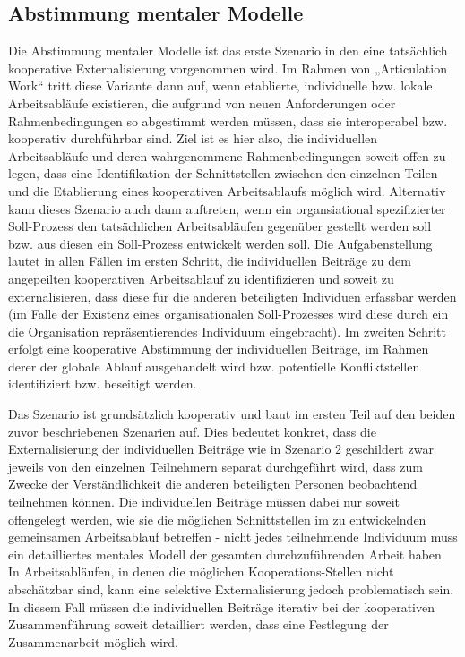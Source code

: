 
\subsection{Abstimmung mentaler Modelle} %
\label{sub:abstimmung_individueller_mentaler_modelle}

Die Abstimmung mentaler Modelle ist das erste Szenario in den eine tatsächlich kooperative Externalisierung vorgenommen wird. Im Rahmen von „Articulation Work“ tritt diese Variante dann auf, wenn etablierte, individuelle bzw. lokale Arbeitsabläufe existieren, die aufgrund von neuen Anforderungen oder Rahmenbedingungen so abgestimmt werden müssen, dass sie interoperabel bzw. kooperativ durchführbar sind. Ziel ist es hier also, die individuellen Arbeitsabläufe und deren wahrgenommene Rahmenbedingungen soweit offen zu legen, dass eine Identifikation der Schnittstellen zwischen den einzelnen Teilen und die Etablierung eines kooperativen Arbeitsablaufs möglich wird. Alternativ kann dieses Szenario auch dann auftreten, wenn ein organsiational spezifizierter Soll-Prozess den tatsächlichen Arbeitsabläufen gegenüber gestellt werden soll bzw. aus diesen ein Soll-Prozess entwickelt werden soll. Die Aufgabenstellung lautet in allen Fällen im ersten Schritt, die individuellen Beiträge zu dem angepeilten kooperativen Arbeitsablauf zu identifizieren und soweit zu externalisieren, dass diese für die anderen beteiligten Individuen erfassbar werden (im Falle der Existenz eines organisationalen Soll-Prozesses wird diese durch ein die Organisation repräsentierendes Individuum eingebracht). Im zweiten Schritt erfolgt eine kooperative Abstimmung der individuellen Beiträge, im Rahmen derer der globale Ablauf ausgehandelt wird bzw. potentielle Konfliktstellen identifiziert bzw. beseitigt werden.

Das Szenario ist grundsätzlich kooperativ und baut im ersten Teil auf den beiden zuvor beschriebenen Szenarien auf. Dies bedeutet konkret, dass die Externalisierung der individuellen Beiträge wie in Szenario 2 geschildert zwar jeweils von den einzelnen Teilnehmern separat durchgeführt wird, dass zum Zwecke der Verständlichkeit die anderen beteiligten Personen beobachtend teilnehmen können. Die individuellen Beiträge müssen dabei nur soweit offengelegt werden, wie sie die möglichen Schnittstellen im zu entwickelnden gemeinsamen Arbeitsablauf betreffen - nicht jedes teilnehmende Individuum muss ein detailliertes mentales Modell der gesamten durchzuführenden Arbeit haben. In Arbeitsabläufen, in denen die möglichen Kooperations-Stellen nicht abschätzbar sind, kann eine selektive Externalisierung jedoch problematisch sein. In diesem Fall müssen die individuellen Beiträge iterativ bei der kooperativen Zusammenführung soweit detailliert werden, dass eine Festlegung der Zusammenarbeit möglich wird.

